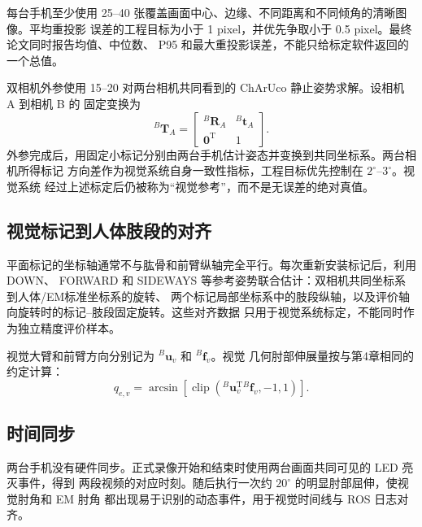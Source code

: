 每台手机至少使用 25--40 张覆盖画面中心、边缘、不同距离和不同倾角的清晰图像。平均重投影
误差的工程目标为小于 1 pixel，并优先争取小于 0.5 pixel。最终论文同时报告均值、中位数、
P95 和最大重投影误差，不能只给标定软件返回的一个总值。

双相机外参使用 15--20 对两台相机共同看到的 ChArUco 静止姿势求解。设相机 A 到相机 B 的
固定变换为
\begin{equation}
  {}^{B}\boldsymbol T_A=
  \begin{bmatrix}
    {}^{B}\boldsymbol R_A&{}^{B}\boldsymbol t_A\\
    \boldsymbol 0^{\mathrm T}&1
  \end{bmatrix}.
  \label{eq:ch6_stereo_transform}
\end{equation}
外参完成后，用固定小标记分别由两台手机估计姿态并变换到共同坐标系。两台相机所得标记
方向差作为视觉系统自身一致性指标，工程目标优先控制在 $2^\circ$--$3^\circ$。视觉系统
经过上述标定后仍被称为“视觉参考”，而不是无误差的绝对真值。

\subsection{视觉标记到人体肢段的对齐}
\label{subsec:ch6_marker_segment_alignment}

平面标记的坐标轴通常不与肱骨和前臂纵轴完全平行。每次重新安装标记后，利用 DOWN、
FORWARD 和 SIDEWAYS 等参考姿势联合估计：双相机共同坐标系到人体/EM标准坐标系的旋转、
两个标记局部坐标系中的肢段纵轴，以及评价轴向旋转时的标记--肢段固定旋转。这些对齐数据
只用于视觉系统标定，不能同时作为独立精度评价样本。

视觉大臂和前臂方向分别记为 $ {}^{B}\boldsymbol u_v$ 和 $ {}^{B}\boldsymbol f_v$。视觉
几何肘部伸展量按与第4章相同的约定计算：
\begin{equation}
  q_{e,v}=\arcsin\left[
  \operatorname{clip}\left(
  {}^{B}\boldsymbol u_v^{\mathrm T}
  {}^{B}\boldsymbol f_v,-1,1\right)
  \right].
  \label{eq:ch6_visual_elbow_angle}
\end{equation}

\subsection{时间同步}
\label{subsec:ch6_time_synchronization}

两台手机没有硬件同步。正式录像开始和结束时使用两台画面共同可见的 LED 亮灭事件，得到
两段视频的对应时刻。随后执行一次约 $20^\circ$ 的明显肘部屈伸，使视觉肘角和 EM 肘角
都出现易于识别的动态事件，用于视觉时间线与 ROS 日志对齐。

